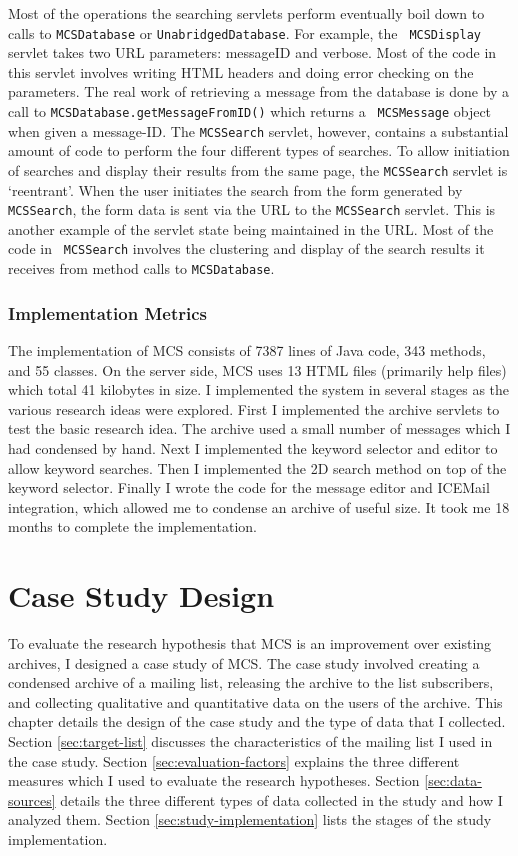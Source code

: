 Most of the operations the searching servlets perform eventually boil down to
calls to {\tt MCSDatabase} or {\tt UnabridgedDatabase}. For example, the {\tt
  MCSDisplay} servlet takes two URL parameters: messageID and verbose. Most of
the code in this servlet involves writing HTML headers and doing error checking
on the parameters. The real work of retrieving a message from the database is
done by a call to {\tt MCSDatabase.getMessageFromID()} which returns a {\tt
  MCSMessage} object when given a message-ID. The {\tt MCSSearch} servlet,
however, contains a substantial amount of code to perform the four different
types of searches. To allow initiation of searches and display their results
from the same page, the {\tt MCSSearch} servlet is `reentrant'. When the user
initiates the search from the form generated by {\tt MCSSearch}, the form data
is sent via the URL to the {\tt MCSSearch} servlet.  This is another example of
the servlet state being maintained in the URL. Most of the code in {\tt
  MCSSearch} involves the clustering and display of the search results it
receives from method calls to {\tt MCSDatabase}.

\subsection{Implementation Metrics}
The implementation of MCS consists of 7387 lines of Java code, 343 methods, and
55 classes. On the server side, MCS uses 13 HTML files (primarily help files)
which total 41 kilobytes in size. I implemented the system in several stages as
the various research ideas were explored. First I implemented the archive
servlets to test the basic research idea. The archive used a small number of
messages which I had condensed by hand. Next I implemented the keyword selector
and editor to allow keyword searches. Then I implemented the 2D search method
on top of the keyword selector. Finally I wrote the code for the message editor
and ICEMail integration, which allowed me to condense an archive of useful
size. It took me 18 months to complete the implementation.


\chapter{Case Study Design}
\label{cha:case-study-design}
To evaluate the research hypothesis that MCS is an improvement over existing
archives, I designed a case study of MCS. The case study involved creating a
condensed archive of a mailing list, releasing the archive to the list
subscribers, and collecting qualitative and quantitative data on the users of
the archive. This chapter details the design of the case study and the type of
data that I collected. Section \ref{sec:target-list} discusses the
characteristics of the mailing list I used in the case study. Section
\ref{sec:evaluation-factors} explains the three different measures which I used
to evaluate the research hypotheses. Section \ref{sec:data-sources} details the
three different types of data collected in the study and how I analyzed them.
Section \ref{sec:study-implementation} lists the stages of the study
implementation.

